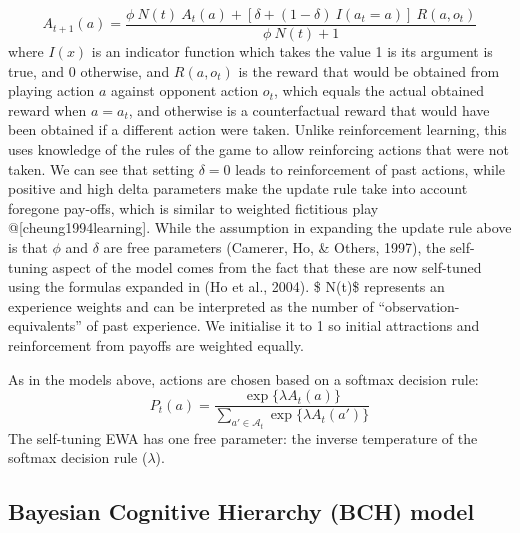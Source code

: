 \documentclass[man,floatsintext]{apa6}
\begin{document}
\[ A_{t+1}(a) =  \frac{\phi \ N(t) \ A_{t}(a) + [ \delta + (1-\delta) \ I(a_t = a )] \ R(a,o_t) } {\phi \ N(t) + 1} \]
where \(I(x)\) is an indicator function which takes the value 1 is its argument is true, and 0 otherwise, and \(R(a,o_t)\) is the reward that would be obtained from playing action \(a\) against opponent action \(o_t\), which equals the actual obtained reward when \(a = a_t\), and otherwise is a counterfactual reward that would have been obtained if a different action were taken. Unlike reinforcement learning, this uses knowledge of the rules of the game to allow reinforcing actions that were not taken. We can see that setting \(\delta = 0\) leads to reinforcement of past actions, while positive and high delta parameters make the update rule take into account foregone pay-offs, which is similar to weighted fictitious play @{[}cheung1994learning{]}. While the assumption in expanding the update rule above is that \(\phi\) and \(\delta\) are free parameters (Camerer, Ho, \& Others, 1997), the self-tuning aspect of the model comes from the fact that these are now self-tuned using the formulas expanded in (Ho et al., 2004). \$ N(t)\$ represents an experience weights and can be interpreted as the number of \enquote{observation-equivalents} of past experience. We initialise it to 1 so initial attractions and reinforcement from payoffs are weighted equally.

As in the models above, actions are chosen based on a softmax decision rule:
\[P_t(a) = \frac{\exp \{\lambda  A_{t}(a) \} }{\sum_{a' \in \mathcal{A}_t} \exp \{ \lambda A_{t}(a') \} }\]
The self-tuning EWA has one free parameter: the inverse temperature of the softmax decision rule (\(\lambda\)).

\subsection{Bayesian Cognitive Hierarchy (BCH) model}
\end{document}
